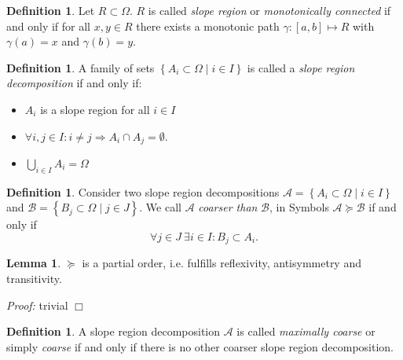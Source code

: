 \documentclass[a4paper,12pt]{paper}
\theoremstyle{plain}
\theoremstyle{definition}
\newtheorem{defn}[thm]{Definition} %
\newtheorem{lem}[thm]{Lemma}
\begin{document}
\begin{defn}
Let $R \subset \Omega$. $R$ is called \emph{slope region} or \emph{monotonically connected} if and only if for all $x, y \in R$ there exists a monotonic path $\gamma: [a,b] \mapsto R$ with $\gamma(a) = x$ and $\gamma(b) = y$.
\end{defn}

\begin{defn}
A family of sets $\left\{ A_i \subset \Omega \mid i \in I \right\}$ is called a \emph{slope region decomposition} if and only if:
\begin{itemize}
\item $A_i$ is a slope region for all $i \in I$
\item $\forall i,j \in I: i \neq j \Rightarrow A_i \cap A_j = \emptyset$.
\item $\bigcup_{i\in I} A_i = \Omega$
\end{itemize}
\end{defn}



\begin{defn}
Consider two slope region decompositions $\mathcal{A} = \left\{ A_i \subset \Omega \mid i \in I \right\}$ and $\mathcal{B} = \left\{ B_j \subset \Omega \mid j \in J \right\}$. We call $\mathcal{A}$ \emph{coarser than} $\mathcal{B}$, in Symbols $\mathcal{A} \succeq \mathcal{B}$ if and only if
\begin{equation*}
\forall j \in J ~ \exists i \in I: B_j \subset A_i.
\end{equation*}
\end{defn}

\begin{lem}
$\succeq$ is a partial order, i.e. fulfills reflexivity, antisymmetry and transitivity.

\emph{Proof:} trivial \hfill $\Box$
\end{lem}

\begin{defn}
A slope region decomposition $\mathcal{A}$ is called \emph{maximally coarse} or simply \emph{coarse} if and only if there is no other coarser slope region decomposition.
\end{defn}
\end{document}
